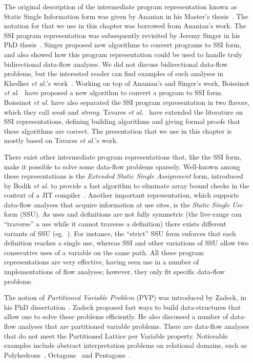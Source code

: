 {The original description of the intermediate program representation known as Static Single Information form was given by Ananian in his Master's thesis~\cite{Ananian99}.
The notation for \sigmafuns that we use in this chapter was borrowed from Ananian's work.
The SSI program representation was subsequently revisited by Jeremy Singer in his PhD thesis~\cite{Singer06}.
Singer proposed new algorithms to convert programs to SSI form, and also showed how this program representation could be used to handle truly bidirectional data-flow analyses.
We did not discuss bidirectional data-flow problems, but the interested reader can find examples of such analyses in Khedker {\em et al.}'s work~\cite{Khedker99}.
Working on top of Ananian's and Singer's work, Boissinot {\em et al.}~\cite{BoissinotBDR12} have proposed a new algorithm to convert a program to SSI form.
Boissinot {\em et al.} have also separated the SSI program representation in two flavors, which they call {\em weak} and {\em strong}.
Tavares {\em et al.}~\cite{Tavares11b} have extended the literature on SSI representations, defining building algorithms and giving formal proofs that these algorithms are correct.
The presentation that we use in this chapter is mostly based on Tavares {\em et
al.}'s work.

There exist other intermediate program representations that, like the SSI form, make it possible to solve some data-flow problems sparsely.
Well-known among these representations is the {\em Extended Static Single Assignment} form, introduced by Bodik {\em et al.} to provide a fast algorithm to eliminate array bound checks in the context of a JIT compiler~\cite{Bodik00}.
Another important representation, which supports data-flow analyses that acquire information at use sites, is the \emph{Static Single Use} form (SSU).
As uses and definitions are not fully symmetric (the live-range can ``traverse'' a use while it cannot traverse a definition) there exists different variants of SSU (eg.~\cite{Plevyak96,George03-IXP,Lo98_registerPromotion}).
For instance, the ``strict'' SSU form enforces that each definition reaches a
single use, whereas SSI and other variations of SSU allow two consecutive uses
of a variable on the same path.
All these program representations are very effective, having seen use in a number of implementations of flow analyses; however, they only fit specific data-flow problems.

The notion of {\em Partitioned Variable Problem} (PVP) was introduced by Zadeck, in his PhD dissertation~\cite{Zadeck84}.
Zadeck proposed fast ways to build data-structures that allow one to solve these problems efficiently.
He also discussed a number of data-flow analyses that are partitioned variable problems.
There are data-flow analyses that do not meet the Partitioned Lattice per Variable property.
Noticeable examples include abstract interpretation problems on relational domains, such as Polyhedrons~\cite{Cousot78}, Octagons~\cite{Mine06} and Pentagons~\cite{Logozzo08}.

}
